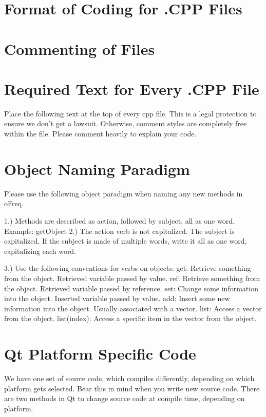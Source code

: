 \section*{Format of Coding for .C\-P\-P Files}

\section*{Commenting of Files}

\section*{Required Text for Every .C\-P\-P File}

Place the following text at the top of every cpp file. This is a legal protection to ensure we don't get a lawsuit. Otherwise, comment styles are completely free within the file. Please comment heavily to explain your code. \hypertarget{ObjectParadigm}{}\section{Object Naming Paradigm}\label{ObjectParadigm}
Please use the following object paradigm when naming any new methods in o\-Freq.

1.) Methods are described as action, followed by subject, all as one word. Example\-: get\-Object 2.) The action verb is not capitalized. The subject is capitalized. If the subject is made of multiple words, write it all as one word, capitalizing each word.

3.) Use the following conventions for verbs on objects\-: get\-: Retrieve something from the object. Retrieved variable passed by value. ref\-: Retrieve something from the object. Retrieved variable passed by reference. set\-: Change some information into the object. Inserted variable passed by value. add\-: Insert some new information into the object. Usually associated with a vector. list\-: Access a vector from the object. list(index)\-: Access a specific item in the vector from the object. \hypertarget{Qt_Platform_Code}{}\section{Qt Platform Specific Code}\label{Qt_Platform_Code}
We have one set of source code, which compiles differently, depending on which platform gets selected. Bear this in mind when you write new source code. There are two methods in Qt to change source code at compile time, depending on platform.

